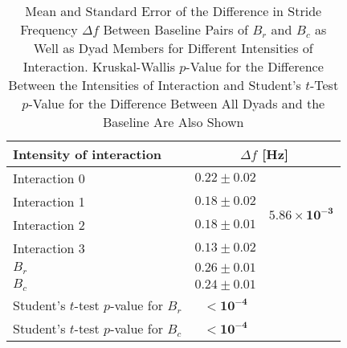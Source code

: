 \begin{table}[!t]
\caption{Mean and Standard Error of the Difference in Stride Frequency $\Delta f$ Between Baseline Pairs of $B_r$ and $B_c$ as Well as Dyad Members for Different Intensities of Interaction. Kruskal-Wallis $p$-Value for the Difference Between the Intensities of Interaction and Student's $t$-Test $p$-Value for the Difference Between All Dyads and the Baseline Are Also Shown\label{tab:delta_f}}
\centering
\begin{tabular}{lcc}
\toprule
Intensity of interaction & \multicolumn{2}{c}{$\Delta f$ [Hz]}  \\
\midrule
Interaction 0 &$0.22 \pm 0.02$  & \multirow{4}{*}{$\mathbf{5.86 \times 10^{-3}}$} \\
Interaction 1 &$0.18 \pm 0.02$ & \\
Interaction 2 &$0.18 \pm 0.01$ & \\
Interaction 3 &$0.13 \pm 0.02$ & \\
\midrule
$B_r$ &$0.26 \pm 0.01$ & \\
$B_c$ &$0.24 \pm 0.01$ & \\
\midrule
Student's $t$-test $p$-value for $B_r$ & $\mathbf{< 10^{-4}}$ \\Student's $t$-test $p$-value for $B_c$ & $\mathbf{< 10^{-4}}$ \\\bottomrule
\end{tabular}
\end{table}
